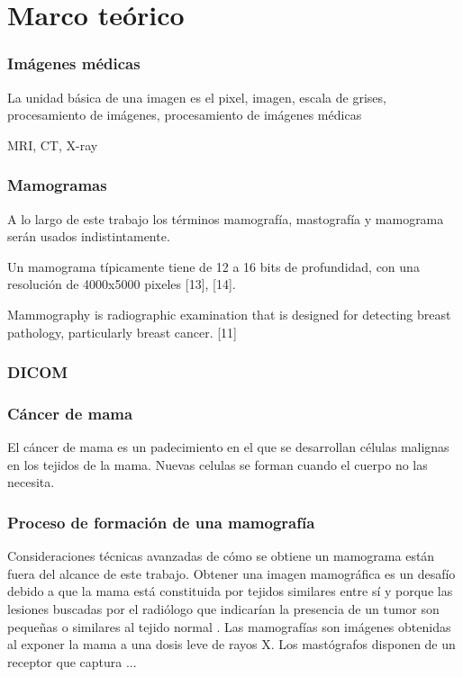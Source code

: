 \chapter{Marco teórico}

\subsection{Imágenes médicas}
La unidad básica de una imagen es el pixel, imagen, escala de grises, procesamiento de
imágenes, procesamiento de imágenes médicas

MRI, CT, X-ray

\subsection{Mamogramas}
A lo largo de este trabajo los términos mamografía, mastografía y mamograma
serán usados indistintamente. 

Un mamograma típicamente tiene de 12 a 16 bits de profundidad, con una
resolución de 4000x5000 pixeles [13], [14].  

Mammography is radiographic examination that is designed for detecting breast
pathology, particularly breast cancer. [11]

\subsection{DICOM}

\subsection{Cáncer de mama} %
El cáncer de mama es un padecimiento en el que se desarrollan células malignas
en los tejidos de la mama. Nuevas celulas se forman cuando el cuerpo no las
necesita. 

\subsection{Proceso de formación de una mamografía}
Consideraciones técnicas avanzadas de cómo se obtiene un mamograma están fuera
del alcance de este trabajo. Obtener una imagen mamográfica es un desafío
debido a que la mama está constituida por tejidos similares entre sí y porque
las lesiones buscadas por el radiólogo que indicarían la presencia de un tumor
son pequeñas o similares al tejido normal \cite{mx:cancer}. Las mamografías son
imágenes obtenidas al exponer la mama a una dosis leve de rayos X. Los
mastógrafos disponen de un receptor que captura ...

